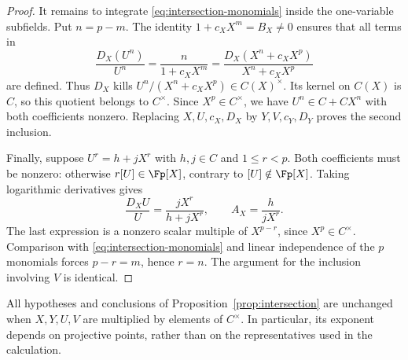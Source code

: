 \begin{proof}
It remains to integrate \eqref{eq:intersection-monomials} inside the
one-variable subfields.  Put $n=p-m$.  The identity
$1+c_XX^m=B_X\ne0$ ensures that all terms in
\[
 \frac{D_X(U^n)}{U^n}
 =\frac{n}{1+c_XX^m}
 =\frac{D_X(X^n+c_XX^p)}{X^n+c_XX^p}
\]
are defined.  Thus $D_X$ kills
$U^n/(X^n+c_XX^p)\in C(X)^\times$.  Its kernel on $C(X)$ is $C$,
so this quotient belongs to $C^\times$.  Since $X^p\in C^\times$,
we have $U^n\in C+CX^n$ with both coefficients nonzero.  Replacing
$X,U,c_X,D_X$ by $Y,V,c_Y,D_Y$ proves the second inclusion.

Finally, suppose $U^r=h+jX^r$ with $h,j\in C$ and $1\le r<p$.
Both coefficients must be nonzero: otherwise
$r[U]\in\Fp[X]$, contrary to $[U]\notin\Fp[X]$.
Taking logarithmic derivatives gives
\[
 \frac{D_XU}{U}=\frac{jX^r}{h+jX^r},
 \qquad A_X=\frac{h}{jX^r}.
\]
The last expression is a nonzero scalar multiple of $X^{p-r}$,
since $X^p\in C^\times$.  Comparison with
\eqref{eq:intersection-monomials} and linear independence of the
$p$ monomials forces $p-r=m$, hence $r=n$.
The argument for the inclusion involving $V$ is identical.
\end{proof}

All hypotheses and conclusions of Proposition~\ref{prop:intersection}
are unchanged when $X,Y,U,V$ are multiplied by elements of $C^\times$.
In particular, its exponent depends on projective points, rather than
on the representatives used in the calculation.
